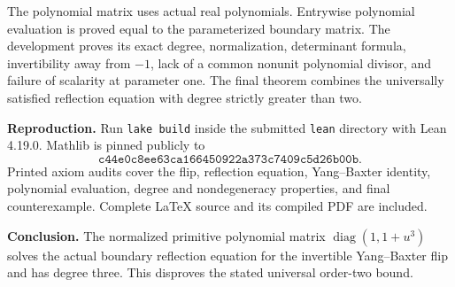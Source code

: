 \documentclass[11pt]{article}
\begin{document}
The polynomial matrix uses actual real polynomials. Entrywise polynomial evaluation is proved equal to the parameterized boundary matrix. The development proves its exact degree, normalization, determinant formula, invertibility away from $-1$, lack of a common nonunit polynomial divisor, and failure of scalarity at parameter one. The final theorem combines the universally satisfied reflection equation with degree strictly greater than two.

\medskip
\noindent\textbf{Reproduction.}
Run \texttt{lake build} inside the submitted \texttt{lean} directory with Lean 4.19.0. Mathlib is pinned publicly to
\[
 \texttt{c44e0c8ee63ca166450922a373c7409c5d26b00b}.
\]
Printed axiom audits cover the flip, reflection equation, Yang--Baxter identity, polynomial evaluation, degree and nondegeneracy properties, and final counterexample. Complete LaTeX source and its compiled PDF are included.

\medskip
\noindent\textbf{Conclusion.}
The normalized primitive polynomial matrix $\operatorname{diag}(1,1+u^3)$ solves the actual boundary reflection equation for the invertible Yang--Baxter flip and has degree three. This disproves the stated universal order-two bound.
\end{document}
